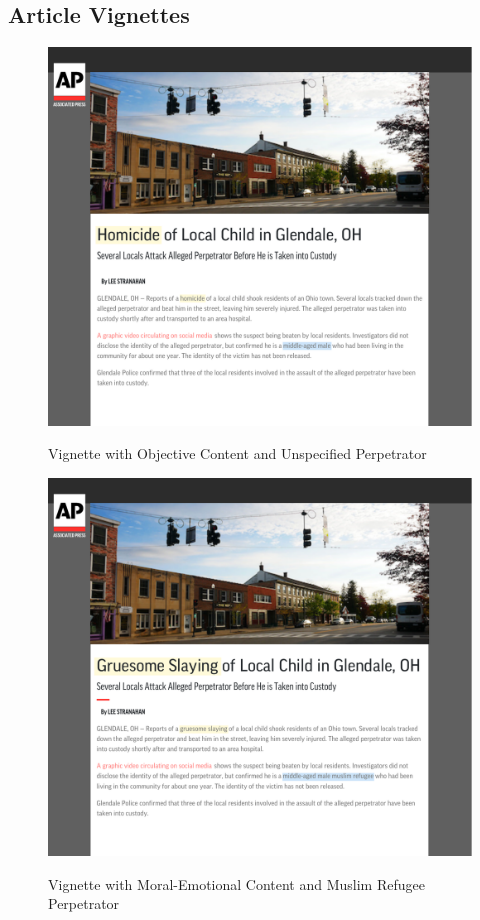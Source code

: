 \documentclass[]{article}
\begin{document}
\subsection{Article Vignettes}

\begin{figure}[!htbp]
  \centering
  \caption{Vignette with Objective Content and Unspecified Perpetrator}
  \vspace{1em}
  \includegraphics[width=.92\textwidth]{figures/hom_uns.pdf}\\
  \label{hom_uns}
\end{figure}

\begin{figure}
  \centering
  \caption{Vignette with Moral-Emotional Content and Muslim Refugee Perpetrator}
  \vspace{1em}
  \includegraphics[width=.92\textwidth]{figures/hom_mus.pdf}\\
  \label{hom_mus}
\end{figure}
\end{document}
